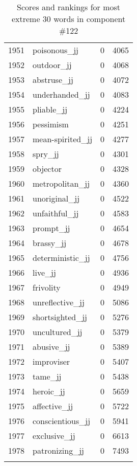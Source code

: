 \begin{longtable}[!htbp]{| rlr@{.}l |}
    1951 & poisonous\_jj & 0 & 4065 \\
    1952 & outdoor\_jj & 0 & 4068 \\
    1953 & abstruse\_jj & 0 & 4072 \\
    1954 & underhanded\_jj & 0 & 4083 \\
    1955 & pliable\_jj & 0 & 4224 \\
    1956 & pessimism & 0 & 4251 \\
    1957 & mean-spirited\_jj & 0 & 4277 \\
    1958 & spry\_jj & 0 & 4301 \\
    1959 & objector & 0 & 4328 \\
    1960 & metropolitan\_jj & 0 & 4360 \\
    1961 & unoriginal\_jj & 0 & 4522 \\
    1962 & unfaithful\_jj & 0 & 4583 \\
    1963 & prompt\_jj & 0 & 4654 \\
    1964 & brassy\_jj & 0 & 4678 \\
    1965 & deterministic\_jj & 0 & 4756 \\
    1966 & live\_jj & 0 & 4936 \\
    1967 & frivolity & 0 & 4949 \\
    1968 & unreflective\_jj & 0 & 5086 \\
    1969 & shortsighted\_jj & 0 & 5276 \\
    1970 & uncultured\_jj & 0 & 5379 \\
    1971 & abusive\_jj & 0 & 5389 \\
    1972 & improviser & 0 & 5407 \\
    1973 & tame\_jj & 0 & 5438 \\
    1974 & heroic\_jj & 0 & 5659 \\
    1975 & affective\_jj & 0 & 5722 \\
    1976 & conscientious\_jj & 0 & 5941 \\
    1977 & exclusive\_jj & 0 & 6613 \\
    1978 & patronizing\_jj & 0 & 7493 \\
    \hline
    \caption{Scores and rankings for most extreme 30 words in component \#122} \\
\end{longtable}
